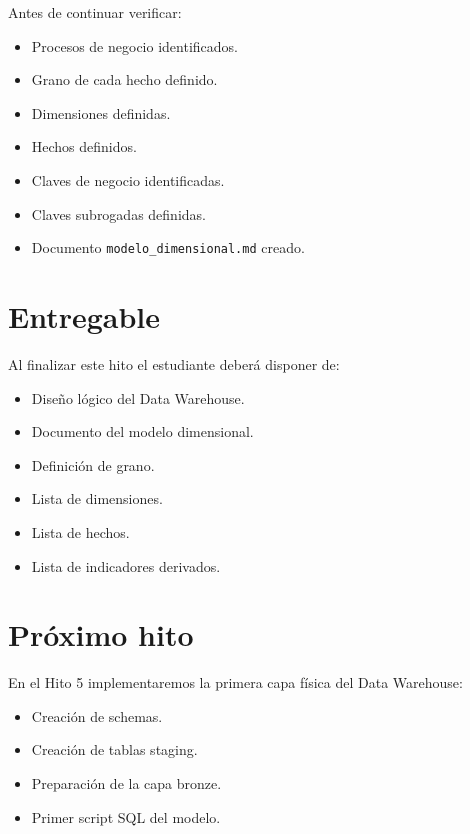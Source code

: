 Antes de continuar verificar:

\begin{itemize}
\item[$\Box$] Procesos de negocio identificados.
\item[$\Box$] Grano de cada hecho definido.
\item[$\Box$] Dimensiones definidas.
\item[$\Box$] Hechos definidos.
\item[$\Box$] Claves de negocio identificadas.
\item[$\Box$] Claves subrogadas definidas.
\item[$\Box$] Documento \texttt{modelo\_dimensional.md} creado.
\end{itemize}

\section{Entregable}

Al finalizar este hito el estudiante deberá disponer de:

\begin{itemize}
\item Diseño lógico del Data Warehouse.
\item Documento del modelo dimensional.
\item Definición de grano.
\item Lista de dimensiones.
\item Lista de hechos.
\item Lista de indicadores derivados.
\end{itemize}

\section{Próximo hito}

En el Hito 5 implementaremos la primera capa física del Data Warehouse:

\begin{itemize}
\item Creación de schemas.
\item Creación de tablas staging.
\item Preparación de la capa bronze.
\item Primer script SQL del modelo.
\end{itemize}
